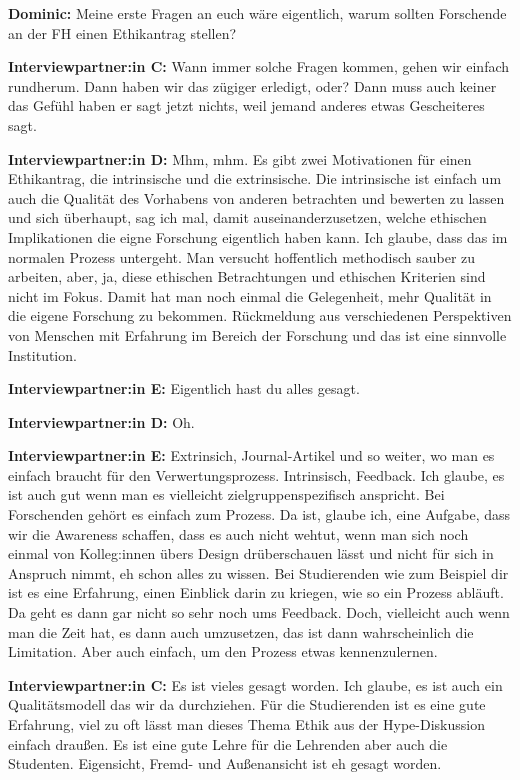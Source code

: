 \documentclass[a4paper,12pt,twoside]{scrreprt}
\begin{document}
\textbf{Dominic:} Meine erste Fragen an euch wäre eigentlich, warum sollten Forschende an der FH einen Ethikantrag stellen?

\textbf{Interviewpartner:in C:} Wann immer solche Fragen kommen, gehen wir einfach rundherum. Dann haben wir das zügiger erledigt, oder? Dann muss auch keiner das Gefühl haben er sagt jetzt nichts, weil jemand anderes etwas Gescheiteres sagt.

\textbf{Interviewpartner:in D:} Mhm, mhm. Es gibt zwei Motivationen für einen Ethikantrag, die intrinsische und die extrinsische. Die intrinsische ist einfach um auch die Qualität des Vorhabens von anderen betrachten und bewerten zu lassen und sich überhaupt, sag ich mal, damit auseinanderzusetzen, welche ethischen Implikationen die eigne Forschung eigentlich haben kann. Ich glaube, dass das im normalen Prozess untergeht. Man versucht hoffentlich methodisch sauber zu arbeiten, aber, ja, diese ethischen Betrachtungen und ethischen Kriterien sind nicht im Fokus. Damit hat man noch einmal die Gelegenheit, mehr Qualität in die eigene Forschung zu bekommen. Rückmeldung aus verschiedenen Perspektiven von Menschen mit Erfahrung im Bereich der Forschung und das ist eine sinnvolle Institution.

\textbf{Interviewpartner:in E:} Eigentlich hast du alles gesagt.

\textbf{Interviewpartner:in D:} Oh.

\textbf{Interviewpartner:in E:} Extrinsich, Journal-Artikel und so weiter, wo man es einfach braucht für den Verwertungsprozess. Intrinsisch, Feedback. Ich glaube, es ist auch gut wenn man es vielleicht zielgruppenspezifisch anspricht. Bei Forschenden gehört es einfach zum Prozess. Da ist, glaube ich, eine Aufgabe, dass wir die Awareness schaffen, dass es auch nicht wehtut, wenn man sich noch einmal von Kolleg:innen übers Design drüberschauen lässt und nicht für sich in Anspruch nimmt, eh schon alles zu wissen. Bei Studierenden wie zum Beispiel dir ist es eine Erfahrung, einen Einblick darin zu kriegen, wie so ein Prozess abläuft. Da geht es dann gar nicht so sehr noch ums Feedback. Doch, vielleicht auch wenn man die Zeit hat, es dann auch umzusetzen, das ist dann wahrscheinlich die Limitation. Aber auch einfach, um den Prozess etwas kennenzulernen.

\textbf{Interviewpartner:in C:} Es ist vieles gesagt worden. Ich glaube, es ist auch ein Qualitätsmodell das wir da durchziehen. Für die Studierenden ist es eine gute Erfahrung, viel zu oft lässt man dieses Thema Ethik aus der Hype-Diskussion einfach draußen. Es ist eine gute Lehre für die Lehrenden aber auch die Studenten. Eigensicht, Fremd- und Außenansicht ist eh gesagt worden.
\end{document}
